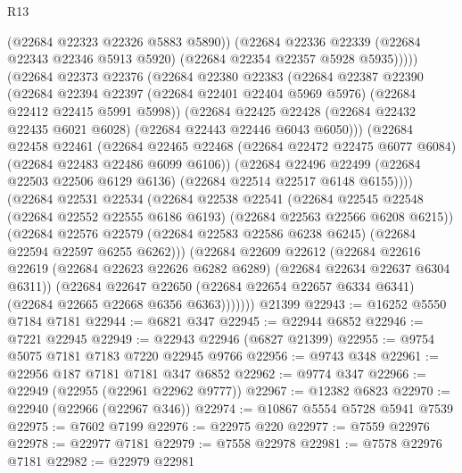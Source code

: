 \begin{lexlean}{R13}
\begin{coremodule}
                (@22684 @22323 @22326 @5883 @5890))
              (@22684
                @22336
                @22339
                (@22684 @22343 @22346 @5913 @5920)
                (@22684 @22354 @22357 @5928 @5935)))))
        (@22684
          @22373
          @22376
          (@22684
            @22380
            @22383
            (@22684
              @22387
              @22390
              (@22684
                @22394
                @22397
                (@22684 @22401 @22404 @5969 @5976)
                (@22684 @22412 @22415 @5991 @5998))
              (@22684
                @22425
                @22428
                (@22684 @22432 @22435 @6021 @6028)
                (@22684 @22443 @22446 @6043 @6050)))
            (@22684
              @22458
              @22461
              (@22684
                @22465
                @22468
                (@22684 @22472 @22475 @6077 @6084)
                (@22684 @22483 @22486 @6099 @6106))
              (@22684
                @22496
                @22499
                (@22684 @22503 @22506 @6129 @6136)
                (@22684 @22514 @22517 @6148 @6155))))
          (@22684
            @22531
            @22534
            (@22684
              @22538
              @22541
              (@22684
                @22545
                @22548
                (@22684 @22552 @22555 @6186 @6193)
                (@22684 @22563 @22566 @6208 @6215))
              (@22684
                @22576
                @22579
                (@22684 @22583 @22586 @6238 @6245)
                (@22684 @22594 @22597 @6255 @6262)))
            (@22684
              @22609
              @22612
              (@22684
                @22616
                @22619
                (@22684 @22623 @22626 @6282 @6289)
                (@22684 @22634 @22637 @6304 @6311))
              (@22684
                @22647
                @22650
                (@22684 @22654 @22657 @6334 @6341)
                (@22684 @22665 @22668 @6356 @6363)))))))
    @21399
@22943 := @16252 @5550 @7184 @7181
@22944 := @6821 @347
@22945 := @22944 @6852
@22946 := @7221 @22945
@22949 := @22943 @22946 (@6827 @21399)
@22955 := @9754 @5075 @7181 @7183 @7220 @22945 @9766
@22956 := @9743 @348
@22961 := @22956 @187 @7181 @7181 @347 @6852
@22962 := @9774 @347
@22966 := @22949 (@22955 (@22961 @22962 @9777))
@22967 := @12382 @6823
@22970 := @22940 (@22966 (@22967 @346))
@22974 := @10867 @5554 @5728 @5941 @7539
@22975 := @7602 @7199
@22976 := @22975 @220
@22977 := @7559 @22976
@22978 := @22977 @7181
@22979 := @7558 @22978
@22981 := @7578 @22976 @7181
@22982 := @22979 @22981

\end{coremodule}
\end{lexlean}
